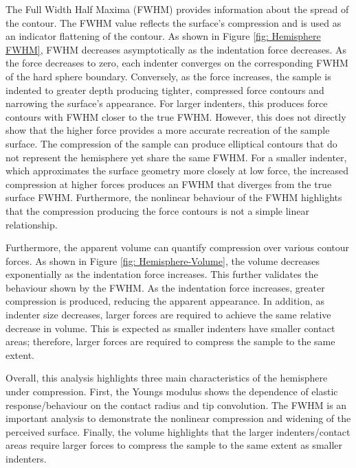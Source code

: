 The Full Width Half Maxima (FWHM) provides information about the spread of the contour. The FWHM value reflects the surface's compression and is used as an indicator flattening of the contour. As shown in Figure \ref{fig: Hemisphere FWHM}, FWHM decreases asymptotically as the indentation force decreases. As the force decreases to zero, each indenter converges on the corresponding FWHM of the hard sphere boundary. Conversely, as the force increases, the sample is indented to greater depth producing tighter, compressed force contours and narrowing the surface's appearance. For larger indenters, this produces force contours with FWHM closer to the true FWHM. However, this does not directly show that the higher force provides a more accurate recreation of the sample surface. The compression of the sample can produce elliptical contours that do not represent the hemisphere yet share the same FWHM. For a smaller indenter, which approximates the surface geometry more closely at low force, the increased compression at higher forces produces an FWHM that diverges from the true surface FWHM. Furthermore, the nonlinear behaviour of the FWHM highlights that the compression producing the force contours is not a simple linear relationship. 

Furthermore, the apparent volume can quantify compression over various contour forces. As shown in Figure \ref{fig: Hemisphere-Volume}, the volume decreases exponentially as the indentation force increases. This further validates the behaviour shown by the FWHM. As the indentation force increases, greater compression is produced, reducing the apparent appearance. In addition, as indenter size decreases, larger forces are required to achieve the same relative decrease in volume. This is expected as smaller indenters have smaller contact areas; therefore, larger forces are required to compress the sample to the same extent.

Overall, this analysis highlights three main characteristics of the hemisphere under compression. First, the Youngs modulus shows the dependence of elastic response/behaviour on the contact radius and tip convolution. The FWHM is an important analysis to demonstrate the nonlinear compression and widening of the perceived surface. Finally, the volume highlights that the larger indenters/contact areas require larger forces to compress the sample to the same extent as smaller indenters.